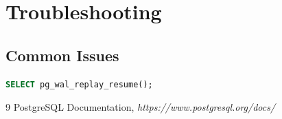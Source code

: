 \documentclass{article}
\begin{document}
\section{Troubleshooting}
\subsection{Common Issues}
\begin{lstlisting}[language=SQL,caption={High Replication Lag}]
SELECT pg_wal_replay_resume();
\end{lstlisting}

\begin{thebibliography}{9}
PostgreSQL Documentation,
\textit{https://www.postgresql.org/docs/}
\end{thebibliography}
\end{document}
